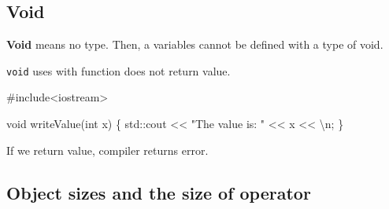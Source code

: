 \documentclass[
  letterpaper,
  DIV=11,
  numbers=noendperiod]{scrreprt}
\newenvironment{Shaded}{\begin{snugshade}}{\end{snugshade}}
\newcommand{\CommentTok}[1]{\textcolor[rgb]{0.37,0.37,0.37}{#1}}
\newcommand{\ErrorTok}[1]{\textcolor[rgb]{0.68,0.00,0.00}{#1}}
\newcommand{\FunctionTok}[1]{\textcolor[rgb]{0.28,0.35,0.67}{#1}}
\newcommand{\NormalTok}[1]{\textcolor[rgb]{0.00,0.23,0.31}{#1}}
\newcommand{\SpecialCharTok}[1]{\textcolor[rgb]{0.37,0.37,0.37}{#1}}
\newcommand{\StringTok}[1]{\textcolor[rgb]{0.13,0.47,0.30}{#1}}
\begin{document}
\hypertarget{void}{%
\subsection{Void}\label{void}}

\textbf{Void} means no type. Then, a variables cannot be defined with a
type of void.

\texttt{void} uses with function does not return value.

\begin{Shaded}
\begin{Highlighting}[]
\CommentTok{\#include\textless{}iostream\textgreater{}}

\NormalTok{void }\FunctionTok{writeValue}\NormalTok{(int x)}
\NormalTok{\{}
\NormalTok{  std}\SpecialCharTok{::}\NormalTok{cout }\SpecialCharTok{\textless{}}\ErrorTok{\textless{}} \StringTok{"The value is: "} \SpecialCharTok{\textless{}}\ErrorTok{\textless{}}\NormalTok{ x }\SpecialCharTok{\textless{}}\ErrorTok{\textless{}} \StringTok{\textquotesingle{}}\SpecialCharTok{\textbackslash{}n}\StringTok{\textquotesingle{}}\NormalTok{;}
\NormalTok{\}}
\end{Highlighting}
\end{Shaded}

If we return value, compiler returns error.

\hypertarget{object-sizes-and-the-size-of-operator}{%
\subsection{Object sizes and the size of
operator}\label{object-sizes-and-the-size-of-operator}}
\end{document}
